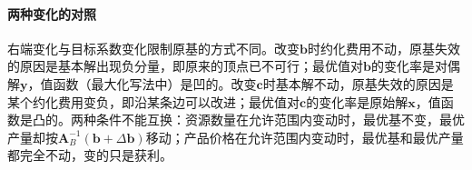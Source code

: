 \paragraph{两种变化的对照}
右端变化与目标系数变化限制原基的方式不同。改变$\bm b$时约化费用不动，原基失效的原因是基本解出现负分量，即原来的顶点已不可行；最优值对$\bm b$的变化率是对偶解$\bm y$，值函数（最大化写法中）是凹的。改变$\bm c$时基本解不动，原基失效的原因是某个约化费用变负，即沿某条边可以改进；最优值对$\bm c$的变化率是原始解$\bm x$，值函数是凸的。两种条件不能互换：资源数量在允许范围内变动时，最优基不变，最优产量却按$\bm A_B^{-1}(\bm b+\Delta\bm b)$移动；产品价格在允许范围内变动时，最优基和最优产量都完全不动，变的只是获利。
